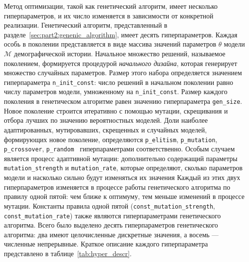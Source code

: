 Метод оптимизации, такой как генетический алгоритм, имеет несколько гиперпараметров, и их число изменяется в зависимости от конкретной реализации.
Генетический алгоритм, представленный в разделе~\ref{sec:part2:genenic_algorithm}, имеет десять гиперпараметров. 
Каждая особь в поколении представляется в виде массива значений параметров $\theta$ модели $\mathcal{M}$ демографической истории.
Начальное множество решений, называемое поколением, формируется процедурой \textit{начального дизайна}, которая генерирует множество случайных параметров.
Размер этого набора определяется значением гиперпараметра \texttt{n\_init\_const}: число решений в начальном поколении равно числу параметров модели, умноженному на \texttt{n\_init\_const}. 
Размер каждого поколения в генетическом алгоритме равен значению гиперпараметра \texttt{gen\_size}.
Новое поколение строится итеративно с помощью мутации, скрещивания и отбора лучших по значению вероятностных моделей.
Доли наиболее адаптированных, мутировавших, скрещенных и случайных моделей, формирующих новое поколение, определяются \texttt{p\_elitism}, \texttt{p\_mutation}, \texttt{p\_crossover}, \texttt{p\_random } гиперпараметрами соответственно.
Особым случаем является процесс адаптивной мутации: дополнительно содержащий параметры \texttt{mutation\_strength} и \texttt{mutation\_rate}, которые определяют, сколько параметров модели и насколько сильно будут изменяться их значения
Каждый из этих двух гиперпараметров изменяется в процессе работы генетического алгоритма по правилу одной пятой: чем ближе к оптимуму, тем меньше изменений в процессе мутации.
Константы правила одной пятой (\texttt{const\_mutation\_strength}, \texttt{const\_mutation\_rate}) также являются гиперпараметрами генетического алгоритма.
Всего было выделено десять гиперпараметров генетического алгоритма: два имеют целочисленные дискретные значения, а восемь --- численные непрерывные.
Краткое описание каждого гиперпараметра представлено в таблице~\ref{tab:hyper_descr}.

